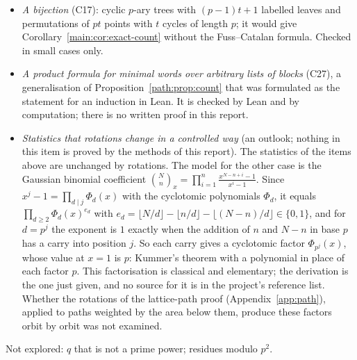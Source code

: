 \documentclass[11pt]{article}
\theoremstyle{definition}
\theoremstyle{remark}
\numberwithin{equation}{section}
\numberwithin{figure}{section}
\begin{document}
\begin{itemize}[itemsep=1pt]
 (experiment E002, with the orbits of the rotation group): for $q\in\{2,3,4,5,8,9\}$ and four weight functions
 for each $q$, no failure of the four checks that the ledger records (integrality, residue, recurrence, and
 the congruence modulo $p^{t+k}$); with a control group that is not transitive on the branches, the
 recurrence fails in $4122$ of $4224$ comparisons. The weight $b(i_v)$ is changed by rotations, so C9 is not a
 case of the corollary above. Supported numerically; not proved.
\item \emph{A bijection} (C17): cyclic $p$-ary trees with $(p-1)t+1$ labelled leaves and permutations of $pt$
 points with $t$ cycles of length $p$; it would give Corollary~\ref{main:cor:exact-count} without the
 Fuss--Catalan formula. Checked in small cases only.
\item \emph{A product formula for minimal words over arbitrary lists of blocks} (C27), a generalisation of
 Proposition~\ref{path:prop:count} that was formulated as the statement for an induction in Lean. It is
 checked by Lean and by computation; there is no written proof in this report.
\item \emph{Statistics that rotations change in a controlled way} (an outlook; nothing in this item is proved
 by the methods of this report). The statistics of the items above are unchanged by rotations. The model for
 the other case is the Gaussian binomial coefficient
 $\binom{N}{n}_x=\prod_{i=1}^{n}\frac{x^{N-n+i}-1}{x^{i}-1}$. Since $x^{j}-1=\prod_{d\mid j}\Phi_d(x)$ with the
 cyclotomic polynomials $\Phi_d$, it equals $\prod_{d\ge2}\Phi_d(x)^{e_d}$ with
 $e_d=\lfloor N/d\rfloor-\lfloor n/d\rfloor-\lfloor (N-n)/d\rfloor\in\{0,1\}$, and for $d=p^{j}$ the exponent
 is $1$ exactly when the addition of $n$ and $N-n$ in base $p$ has a carry into position $j$. So each carry
 gives a cyclotomic factor $\Phi_{p^j}(x)$, whose value at $x=1$ is $p$: Kummer's theorem with a polynomial in
 place of each factor $p$. This factorisation is classical and elementary; the derivation is the one just
 given, and no source for it is in the project's reference list. Whether the rotations of the lattice-path
 proof (Appendix~\ref{app:path}), applied to paths weighted by the area below them, produce these factors
 orbit by orbit was not examined.
\end{itemize}
Not explored: $q$ that is not a prime power; residues modulo $p^2$.


\end{document}
